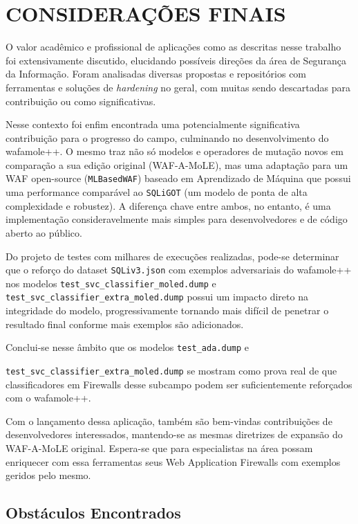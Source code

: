 \chapter{CONSIDERAÇÕES FINAIS}
\label{chp:capitulo6}
O valor acadêmico e profissional de aplicações como as descritas nesse trabalho foi extensivamente discutido, elucidando possíveis direções da área de Segurança da Informação. Foram analisadas diversas propostas e repositórios com ferramentas e soluções de \textit{hardening} no geral, com muitas sendo descartadas para contribuição ou como significativas. 

Nesse contexto foi enfim encontrada uma potencialmente significativa contribuição para o progresso do campo, culminando no desenvolvimento do wafamole++. O mesmo traz não só modelos e operadores de mutação novos em comparação a sua edição original (WAF-A-MoLE), mas uma adaptação para um WAF open-source (\verb+MLBasedWAF+) baseado em Aprendizado de Máquina que possui uma performance comparável ao \verb+SQLiGOT+ (um modelo de ponta de alta complexidade e robustez). A diferença chave entre ambos, no entanto, é uma implementação consideravelmente mais simples para desenvolvedores e de código aberto ao público.

Do projeto de testes com milhares de execuções realizadas, pode-se determinar que o reforço do dataset \verb+SQLiv3.json+ com exemplos adversariais do wafamole++ nos modelos \verb+test_svc_classifier_moled.dump+ e \verb+test_svc_classifier_extra_moled.dump+ possui um impacto direto na integridade do modelo, progressivamente tornando mais difícil de penetrar o resultado final conforme mais exemplos são adicionados.

Conclui-se nesse âmbito que os modelos \verb+test_ada.dump+ e 

\verb+test_svc_classifier_extra_moled.dump+ se mostram como prova real de que classificadores em Firewalls desse subcampo podem ser suficientemente reforçados com o wafamole++.

Com o lançamento dessa aplicação, também são bem-vindas contribuições de desenvolvedores interessados, mantendo-se as mesmas diretrizes de expansão do WAF-A-MoLE original. Espera-se que para especialistas na área possam enriquecer com essa ferramentas seus Web Application Firewalls com exemplos geridos pelo mesmo.

\section{Obstáculos Encontrados}

